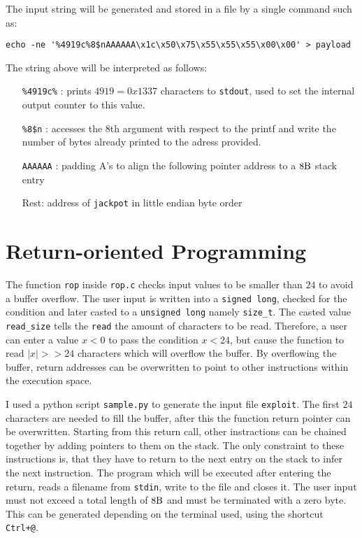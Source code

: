 \documentclass[12pt]{article}
\begin{document}
The input string will be generated and stored in a file by a single command such as:
\begin{lstlisting}
echo -ne '%4919c%8$nAAAAAA\x1c\x50\x75\x55\x55\x55\x00\x00' > payload
\end{lstlisting}
The string above will be interpreted as follows:
\begin{itemize}
	\item[\texttt{\%4919c\%} :] prints $4919 = 0x1337$ characters to \texttt{stdout}, used to set the internal output counter to this value.
	\item[\texttt{\%8\$n} :] accesses the 8th argument with respect to the printf and write the number of bytes already printed to the adress provided.
	\item[\texttt{AAAAAA} :] padding A's to align the following pointer address to a $8\si{\byte}$ stack entry
	\item[Rest:] address of \texttt{jackpot} in little endian byte order
\end{itemize}





\newpage
\section{Return-oriented Programming}
The function \texttt{rop} inside \texttt{rop.c} checks input values to be smaller than $24$ to avoid a buffer overflow. The user input is written into a \texttt{signed long}, checked for the condition and later casted to a \texttt{unsigned long} namely \texttt{size\_t}. The casted value \texttt{read\_size} tells the \texttt{read} the amount of characters to be read. Therefore, a user can enter a value $x<0$ to pass the condition $x<24$, but cause the function to read $|x|>>24$ characters which will overflow the  buffer.
By overflowing the buffer, return addresses can be overwritten to point to other instructions within the execution space.

I used a python script \texttt{sample.py} to generate the input file \texttt{exploit}.
The first $24$ characters are needed to fill the buffer, after this the function return pointer can be overwritten.
Starting from this return call, other instractions can be chained together by adding pointers to them on the stack. 
The only constraint to these instructions is, that they have to return to the next entry on the stack to infer the next instruction.
The program which will be executed after entering the return, reads a filename from \texttt{stdin}, write to the file and closes it.
The user input must not exceed a total length of $8\si{\byte}$ and must be terminated with a zero byte. This can be generated depending on the terminal used, using the shortcut \texttt{Ctrl+@}.
\end{document}
